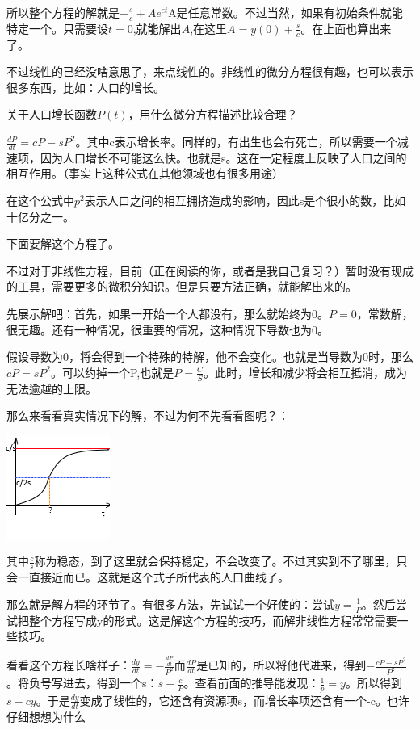 \documentclass[UTF8]{ctexbook}
\begin{document}
{{{{  所以整个方程的解就是$-\frac{s}{c} + Ae^{ct}$A是任意常数。不过当然，如果有初始条件就能特定一个。只需要设$t = 0$,就能解出$A$,在这里$A = y(0) + \frac{s}{c}$。在上面也算出来了。

  不过线性的已经没啥意思了，来点线性的。非线性的微分方程很有趣，也可以表示很多东西，比如：人口的增长。

  关于人口增长函数$P(t)$，用什么微分方程描述比较合理？

  $\frac{dP}{dt} = cP - sP^2$。其中c表示增长率。同样的，有出生也会有死亡，所以需要一个减速项，因为人口增长不可能这么快。也就是s。这在一定程度上反映了人口之间的相互作用。（事实上这种公式在其他领域也有很多用途）

  在这个公式中$p^2$表示人口之间的相互拥挤造成的影响，因此s是个很小的数，比如十亿分之一。

  下面要解这个方程了。

  不过对于非线性方程，目前（正在阅读的你，或者是我自己复习？）暂时没有现成的工具，需要更多的微积分知识。但是只要方法正确，就能解出来的。

  先展示解吧：首先，如果一开始一个人都没有，那么就始终为0。$P = 0$，常数解，很无趣。还有一种情况，很重要的情况，这种情况下导数也为0。

  假设导数为0，将会得到一个特殊的特解，他不会变化。也就是当导数为0时，那么$cP = sP^2$。可以约掉一个P,也就是$P = \frac{C}{S}$。此时，增长和减少将会相互抵消，成为无法逾越的上限。

  那么来看看真实情况下的解，不过为何不先看看图呢？：

  \includegraphics{resources/nonLinearDifferencialEquation_HumanGrow.png}

  其中$\frac{c}{s}$称为稳态，到了这里就会保持稳定，不会改变了。不过其实到不了哪里，只会一直接近而已。这就是这个式子所代表的人口曲线了。

  那么就是解方程的环节了。有很多方法，先试试一个好使的：尝试$y = \frac{1}{P}$。然后尝试把整个方程写成y的形式。这是解这个方程的技巧，而解非线性方程常常需要一些技巧。

  看看这个方程长啥样子：$\frac{dy}{dt} = -\frac{\frac{dP}{dt}}{P^2}$而$\frac{dP}{dt}$是已知的，所以将他代进来，得到$-\frac{cP - sP^2}{P^2}$。将负号写进去，得到一个s：$s - \frac{c}{P}$。查看前面的推导能发现：$\frac{1}{p} = y$。所以得到$s - cy$。于是$\frac{dy}{dt}$变成了线性的，它还含有资源项s，而增长率项还含有一个-c。也许仔细想想为什么

}}}}
\end{document}
